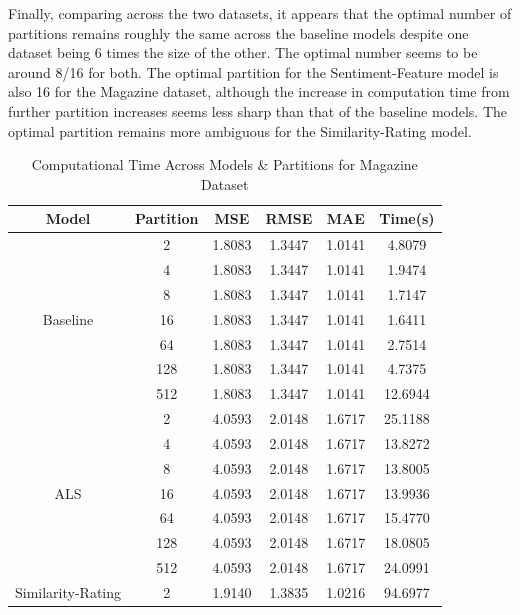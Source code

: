 \documentclass[sigconf,authorversion,nonacm]{acmart}
\begin{document}
Finally, comparing across the two datasets, it appears that the optimal number of partitions remains roughly the same across the baseline models despite one dataset being 6 times the size of the other. The optimal number seems to be around 8/16 for both. The optimal partition for the Sentiment-Feature model is also 16 for the Magazine dataset, although the increase in computation time from further partition increases seems less sharp than that of the baseline models. The optimal partition remains more ambiguous for the Similarity-Rating model. 

\begin{table}
        \caption{Computational Time Across Models \& Partitions for Magazine Dataset}
        \label{tab:compute_magazine}
        \begin{tabular}{@{}cccccc@{}}
        \toprule
        \textbf{Model} & \textbf{Partition} & \textbf{MSE} & \textbf{RMSE} & \textbf{MAE} & \textbf{Time(s)} \\
        \midrule
        \multirow{7}{*}{Baseline} & 2 & 1.8083 & 1.3447 & 1.0141 & 4.8079 \\
                 & 4 & 1.8083 & 1.3447 & 1.0141 & 1.9474 \\
                 & 8 & 1.8083 & 1.3447 & 1.0141 & 1.7147 \\
                 & 16 & 1.8083 & 1.3447 & 1.0141 & 1.6411 \\
                 & 64 & 1.8083 & 1.3447 & 1.0141 & 2.7514 \\
                 & 128 & 1.8083 & 1.3447 & 1.0141 & 4.7375 \\
                 & 512 & 1.8083 & 1.3447 & 1.0141 & 12.6944 \\\midrule
        \multirow{7}{*}{ALS} & 2 & 4.0593 & 2.0148 & 1.6717 & 25.1188 \\
                 & 4 & 4.0593 & 2.0148 & 1.6717 & 13.8272 \\
                 & 8 & 4.0593 & 2.0148 & 1.6717 & 13.8005 \\
                 & 16 & 4.0593 & 2.0148 & 1.6717 & 13.9936 \\
                 & 64 & 4.0593 & 2.0148 & 1.6717 & 15.4770 \\
                 & 128 & 4.0593 & 2.0148 & 1.6717 & 18.0805 \\
                 & 512 & 4.0593 & 2.0148 & 1.6717 & 24.0991 \\\midrule
        \multirow{7}{*}{Similarity-Rating} & 2 & 1.9140 & 1.3835 & 1.0216 & 94.6977 \\

\end{tabular}
\end{table}
\end{document}
